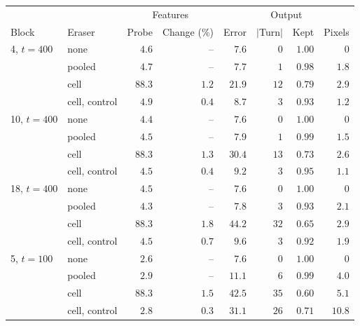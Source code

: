 \begin{tabular}{llrrrrrr}
\toprule
 & & \multicolumn{2}{c}{Features} & \multicolumn{4}{c}{Output} \\
Block & Eraser & Probe & Change (\%) & Error & $|$Turn$|$ & Kept & Pixels \\
\midrule
4, $t=400$ & none & $4.6$ & -- & $7.6$ & $0$ & $1.00$ & $0$ \\
 & pooled & $4.7$ & -- & $7.7$ & $1$ & $0.98$ & $1.8$ \\
 & cell & $88.3$ & $1.2$ & $21.9$ & $12$ & $0.79$ & $2.9$ \\
 & cell, control & $4.9$ & $0.4$ & $8.7$ & $3$ & $0.93$ & $1.2$ \\
\midrule
10, $t=400$ & none & $4.4$ & -- & $7.6$ & $0$ & $1.00$ & $0$ \\
 & pooled & $4.5$ & -- & $7.9$ & $1$ & $0.99$ & $1.5$ \\
 & cell & $88.3$ & $1.3$ & $30.4$ & $13$ & $0.73$ & $2.6$ \\
 & cell, control & $4.5$ & $0.4$ & $9.2$ & $3$ & $0.95$ & $1.1$ \\
\midrule
18, $t=400$ & none & $4.5$ & -- & $7.6$ & $0$ & $1.00$ & $0$ \\
 & pooled & $4.3$ & -- & $7.8$ & $3$ & $0.93$ & $2.1$ \\
 & cell & $88.3$ & $1.8$ & $44.2$ & $32$ & $0.65$ & $2.9$ \\
 & cell, control & $4.5$ & $0.7$ & $9.6$ & $3$ & $0.92$ & $1.9$ \\
\midrule
5, $t=100$ & none & $2.6$ & -- & $7.6$ & $0$ & $1.00$ & $0$ \\
 & pooled & $2.9$ & -- & $11.1$ & $6$ & $0.99$ & $4.0$ \\
 & cell & $88.3$ & $1.5$ & $42.5$ & $35$ & $0.60$ & $5.1$ \\
 & cell, control & $2.8$ & $0.3$ & $31.1$ & $26$ & $0.71$ & $10.8$ \\
\bottomrule
\end{tabular}
